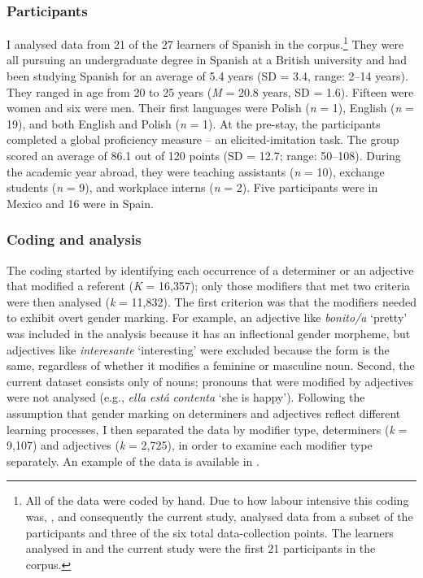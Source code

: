 \documentclass[output=paper,colorlinks,citecolor=brown,modfonts,nonflat]{../langscibook}
\begin{document}
\subsubsection{Participants}\label{sec:gudmestad:3.1.2}

I analysed data from 21 of the 27 learners of Spanish in the corpus.\footnote{{All of the data were coded by hand. Due to how labour intensive this coding was, \citet{GudmestadEtAl2019}, and consequently the current study, analysed data from a subset of the participants and three of the six total data-collection points. The learners analysed in \citeauthor{GudmestadEtAl2019} and the current study were the first 21 participants in the corpus.}} They were all pursuing an undergraduate degree in Spanish at a British university and had been studying Spanish for an average of 5.4 years (SD = 3.4, range: 2--14 years). They ranged in age from 20 to 25 years (\textit{M} = 20.8 years, SD = 1.6). Fifteen were women and six were men. Their first languages were Polish (\textit{n} = 1), English (\textit{n} = 19), and both English and Polish (\textit{n} = 1). At the pre-stay, the participants completed a global proficiency measure – an elicited-imitation task. The group scored an average of 86.1 out of 120 points (SD = 12.7; range: 50--108). During the academic year abroad, they were teaching assistants (\textit{n} = 10), exchange students (\textit{n} = 9), and workplace interns (\textit{n} = 2). Five participants were in Mexico and 16 were in Spain.


\subsubsection{Coding and analysis}\label{sec:gudmestad:3.1.3}

The coding started by identifying each occurrence of a determiner or an adjective that modified a referent (\textit{K} = 16,357); only those modifiers that met two criteria were then analysed (\textit{k} = 11,832). The first criterion was that the modifiers needed to exhibit overt gender marking. For example, an adjective like \textit{bonito/a} ‘pretty’ was included in the analysis because it has an inflectional gender morpheme, but adjectives like \textit{interesante} ‘interesting’ were excluded because the form is the same, regardless of whether it modifies a feminine or masculine noun. Second, the current dataset consists only of nouns; pronouns that were modified by adjectives were not analysed (e.g., \textit{ella} \textit{está} \textit{contenta} ‘she is happy’). Following the assumption that gender marking on determiners and adjectives reflect different learning processes, I then separated the data by modifier type, determiners (\textit{k} = 9,107) and adjectives (\textit{k} = 2,725), in order to examine each modifier type separately. An example of the data is available in .
\end{document}
